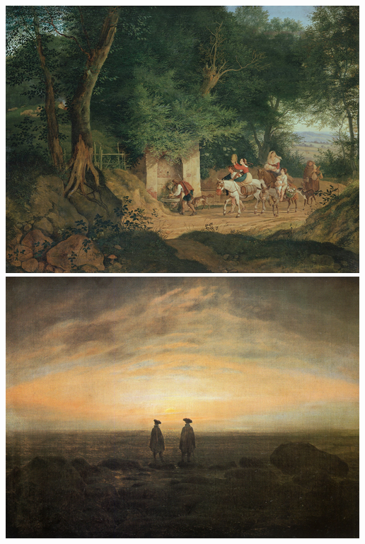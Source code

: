 \documentclass[
  letterpaper,
  DIV=11,
  numbers=noendperiod]{scrartcl}
\begin{document}
\includegraphics{paintingsSommer_files/figure-pdf/cell-5-output-9.png}
\includegraphics{paintingsSommer_files/figure-pdf/cell-5-output-10.png}
\end{document}
